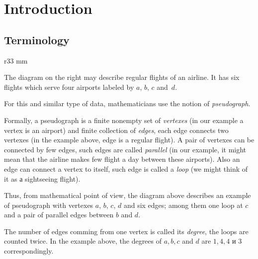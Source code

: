 \chapter{Introduction}
\section*{Terminology}

\begin{wrapfigure}{r}{33 mm}
\end{wrapfigure}

The diagram on the right may describe regular flights of an airline.
It has six flights which serve four airports labeled by $a$, $b$, $c$ and~$d$.

For this and similar type of data, mathematicians use the notion of \emph{pseudograph}.

Formally, a pseudograph is a finite nonempty set of \emph{vertexes}  (in our example a vertex is an airport) 
and finite collection of \emph{edges}, each edge connects two vertexes (in the example above, edge is a regular flight).
A pair of vertexes can be connected by few edges, such edges are called \emph{parallel} (in our example, it might mean that the airline makes few  flight a day between these airports). 
Also an edge can connect a vertex to itself, such edge is called a \emph{loop} (we might think of it as а sightseeing flight).

Thus, from mathematical point of view, the diagram above describes an example of pseudograph with vertexes $a$, $b$, $c$, $d$ and 
six edges; among them one loop at $c$ and a pair of parallel edges between $b$ and $d$.

\smallskip

The number of edges comming from one vertex is called its \emph{degree}, the loops are counted twice.
In the example above,
the degrees of $a,b,c$ and $d$ are $1,4,4$ и $3$ correspondingly.

